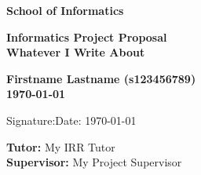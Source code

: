 \documentclass[a4paper,11pt]{article}
\newcommand{\name}{Firstname Lastname (s123456789)}
\newcommand{\field}{Whatever I Write About}
\newcommand{\tutor}{My IRR Tutor}
\newcommand{\supervisor}{My Project Supervisor}
\begin{document}
\begin{minipage}[b]{110mm}
        {\Huge\bf School of Informatics
        \vspace*{17mm}}
\end{minipage}
\hfill
\begin{minipage}[t]{40mm}               
\end{minipage}
\par\noindent
\vspace*{2cm}
\begin{center}
        \Large\bf Informatics Project Proposal \\
        \Large\bf \field
\end{center}
\vspace*{1.5cm}
\begin{center}
        \bf \name\\
        \monthyeardate\today
\end{center}
\vspace*{5mm}

%
%                       
\begin{abstract}
        The abstract is a short concise outline of your 
        project proposal, {\bf of no more than 100 words}.
\end{abstract}

\vspace*{1cm}

\vspace*{3cm}
Signature:\hspace*{8cm}Date: \today

\vfill
{\bf Tutor:} \tutor\\
{\bf Supervisor:} \supervisor
\newpage

\setcounter{page}{1}                            %
\footruleheight{1pt}
\headruleheight{1pt}
\rhead{- \thepage}
\cfoot{}
%
\tableofcontents                                %
\end{document}
